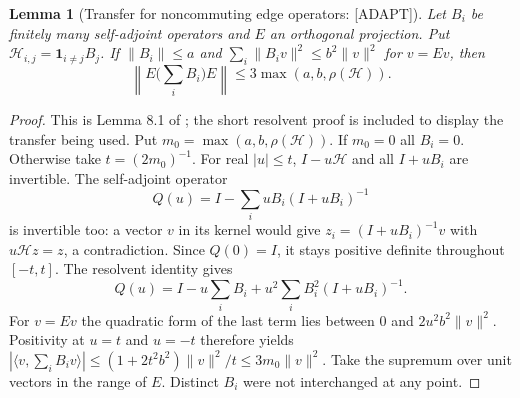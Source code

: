 \documentclass[11pt,a4paper]{article}
\numberwithin{equation}{section}
\newtheorem{lemma}[theorem]{Lemma}
\theoremstyle{remark}\newtheorem{remark}[theorem]{Remark}
\newcommand{\1}{\mathbf 1}
\begin{document}
\begin{lemma}[Transfer for noncommuting edge operators: {\rm[ADAPT]}]
\label{lem:transfer}
Let $B_i$ be finitely many self-adjoint operators and $E$ an orthogonal
projection. Put $\mathscr H_{i,j}=\1_{i\ne j}B_j$. If $\|B_i\|\le a$
and $\sum_i\|B_iv\|^2\le b^2\|v\|^2$ for $v=Ev$, then
\begin{equation}\label{eq:transfer}
 \left\|E\Big(\sum_iB_i\Big)E\right\|
 \le3\max(a,b,\rho(\mathscr H)).
\end{equation}
\end{lemma}
\begin{proof}
This is Lemma 8.1 of \cite{final}; the short resolvent proof is included
to display the transfer being used. Put $m_0=\max(a,b,\rho(\mathscr H))$.
If $m_0=0$ all $B_i=0$. Otherwise take $t=(2m_0)^{-1}$. For real
$|u|\le t$, $I-u\mathscr H$ and all $I+uB_i$ are invertible. The
self-adjoint operator
\[
 Q(u)=I-\sum_i uB_i(I+uB_i)^{-1}
\]
is invertible too: a vector $v$ in its kernel would give
$z_i=(I+uB_i)^{-1}v$ with $u\mathscr Hz=z$, a contradiction.
Since $Q(0)=I$, it stays positive definite throughout $[-t,t]$.
The resolvent identity gives
\[
 Q(u)=I-u\sum_iB_i+u^2\sum_iB_i^2(I+uB_i)^{-1}.
\]
For $v=Ev$ the quadratic form of the last term lies between $0$ and
$2u^2b^2\|v\|^2$. Positivity at $u=t$ and $u=-t$ therefore yields
$|\langle v,\sum_iB_iv\rangle|\le(1+2t^2b^2)\|v\|^2/t
\le3m_0\|v\|^2$. Take the supremum over unit vectors in the range
of $E$. Distinct $B_i$ were not interchanged at any point.
\end{proof}
\end{document}
